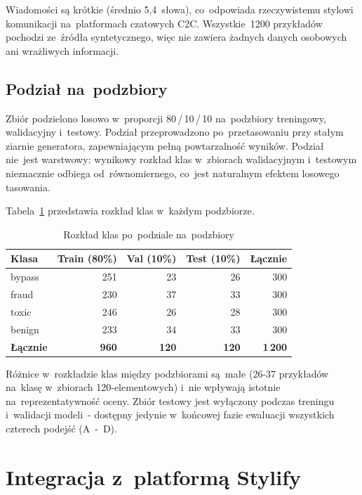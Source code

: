 Wiadomości są krótkie (średnio 5,4~słowa), co~odpowiada rzeczywistemu
stylowi komunikacji na~platformach czatowych C2C. Wszystkie~1200 przykładów
pochodzi ze~źródła syntetycznego, więc nie zawiera żadnych danych osobowych ani wrażliwych informacji.

\subsection{Podział na~podzbiory}
\label{sec:dataset-podzial}

Zbiór podzielono losowo w~proporcji 80\,/\,10\,/\,10 na~podzbiory treningowy,
walidacyjny i~testowy. Podział przeprowadzono po~przetasowaniu
przy stałym ziarnie generatora, zapewniającym pełną
powtarzalność wyników. Podział nie~jest warstwowy:
wynikowy rozkład klas w~zbiorach walidacyjnym i~testowym nieznacznie odbiega
od~równomiernego, co~jest naturalnym efektem losowego tasowania.

Tabela~\ref{tab:dataset-split} przedstawia rozkład klas w~każdym podzbiorze.

\begin{table}[H]
\centering
\caption{Rozkład klas po~podziale na~podzbiory}
\label{tab:dataset-split}
\renewcommand{\arraystretch}{1.2}
\begin{tabular}{lrrrr}
\hline
\textbf{Klasa} & \textbf{Train (80\%)} & \textbf{Val (10\%)} & \textbf{Test (10\%)} & \textbf{Łącznie} \\
\hline
bypass  & 251 & 23 & 26 & 300 \\
fraud   & 230 & 37 & 33 & 300 \\
toxic   & 246 & 26 & 28 & 300 \\
benign  & 233 & 34 & 33 & 300 \\
\hline
\textbf{Łącznie} & \textbf{960} & \textbf{120} & \textbf{120} & \textbf{1\,200} \\
\hline
\end{tabular}
\end{table}

Różnice w~rozkładzie klas między podzbiorami są~małe (26-37 przykładów
na~klasę w~zbiorach 120-elementowych) i~nie wpływają istotnie na~reprezentatywność
oceny. Zbiór testowy jest wyłączony podczas treningu i~walidacji modeli~-
dostępny jedynie w~końcowej fazie ewaluacji wszystkich czterech podejść (A~-~D).

\section{Integracja z~platformą Stylify}
\label{sec:integracja}

